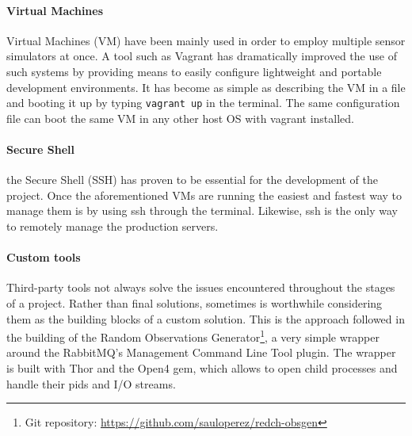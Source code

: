 \paragraph{Virtual Machines} Virtual Machines (VM) have been mainly used in order to employ multiple sensor simulators at once. A tool such as Vagrant has dramatically improved the use of such systems by providing means to easily configure lightweight and portable development environments. It has become as simple as describing the VM in a file and booting it up by typing \texttt{vagrant up} in the terminal. The same configuration file can boot the same VM in any other host OS with vagrant installed.


\paragraph{Secure Shell} the Secure Shell (SSH) has proven to be essential for the development of the project. Once the aforementioned VMs are running the easiest and fastest way to manage them is by using ssh through the terminal. Likewise, ssh is the only way to remotely manage the production servers.

\paragraph{Custom tools} Third-party tools not always solve the issues encountered throughout the stages of a project. Rather than final solutions, sometimes is worthwhile considering them as the building blocks of a custom solution. This is the approach followed in the building of the Random Observations Generator\footnote{Git repository: \url{https://github.com/sauloperez/redch-obsgen}}, a very simple wrapper around the RabbitMQ's Management Command Line Tool plugin. The wrapper is built with Thor and the Open4 gem, which allows to open child processes and handle their pids and I/O streams.


